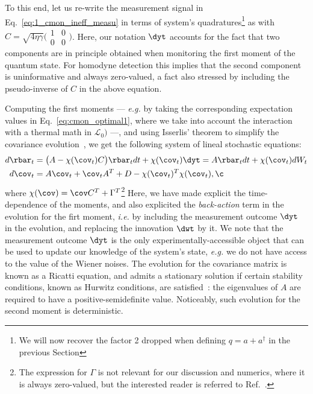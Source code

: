 To this end, let us re-write the measurement signal in Eq.~\ref{eq:1_cmon_ineff_measu} in terms of system's quadratures\footnote{We will now recover the factor 2 dropped when defining $q = a + a^\dagger$ in the previous Section} as
with $C = \sqrt{4 \eta \gamma}\Big(\begin{matrix}1&0\\0&0\end{matrix}\Big)$. Here, our notation $\dyt$ accounts for the fact that two components are in principle obtained when monitoring the first moment of the quantum state. For homodyne detection this implies that the second component is uninformative and always zero-valued, a fact also stressed by including the pseudo-inverse of $C$ in the above equation.

Computing the first moments --- \textit{e.g.} by taking the corresponding expectation values in Eq.~\ref{eq:cmon_optimal1}, where we take into account the interaction with a thermal math in $\mathcal{L}_0)$ ---, and using Isserlis' theorem to simplify the covariance evolution~\cite{JacobsStraightfoward2006}, we get the following system of lineal stochastic equations:
\begin{align}\label{eq:cmon_LINEALSYSTEM}
d\rbar_t &= \big(A - \chi(\cov_t) C\big) \rbar_t dt + \chi(\cov_t) \dyt = A \rbar_t dt + \chi(\cov_t) dW_t \\
d\cov_t &= A \cov_t + \cov_t A^T + D - \chi(\cov_t)^T \chi(\cov_t), \nonumber¸
\end{align}
where $\chi(\cov) = \cov C^T + \Gamma^T$\footnote{The expression for $\Gamma$ is not relevant for our discussion and numerics, where it is always zero-valued, but the interested reader is referred to Ref.~\cite{Wiseman2005optimal}.} Here, we have made explicit the time-dependence of the moments, and also explicited the \textit{back-action} term in the evolution for the firt moment, \textit{i.e.} by including the measurement outcome $\dyt$ in the evolution, and replacing the innovation $\dwt$ by it. We note that the measurement outcome $\dyt$ is the only experimentally-accessible object that can be used to update our knowledge of the system's state, \textit{e.g.} we do not have access to the value of the Wiener noises. The evolution for the covariance matrix is known as a Ricatti equation, and admits a stationary solution if certain stability conditions, known as Hurwitz conditions, are satisfied~\cite{Wiseman2005optimal}: the eigenvalues of $A$ are required to have a positive-semidefinite value. Noticeably, such evolution for the second moment is deterministic.

